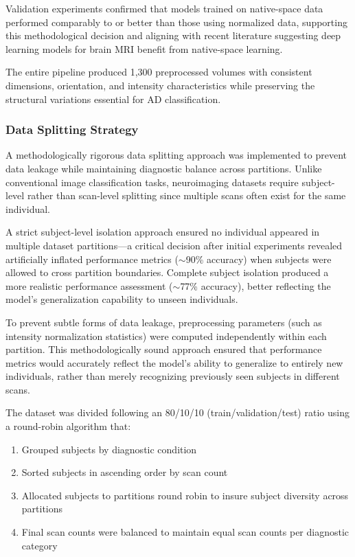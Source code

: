\documentclass[11pt, a4paper]{article}
\begin{document}
Validation experiments confirmed that models trained on native-space data performed comparably to or better than those using normalized data, supporting this methodological decision and aligning with recent literature suggesting deep learning models for brain MRI benefit from native-space learning.

The entire pipeline produced 1,300 preprocessed volumes with consistent dimensions, orientation, and intensity characteristics while preserving the structural variations essential for AD classification.

\subsubsection{Data Splitting Strategy}

A methodologically rigorous data splitting approach was implemented to prevent data leakage while maintaining diagnostic balance across partitions. Unlike conventional image classification tasks, neuroimaging datasets require subject-level rather than scan-level splitting since multiple scans often exist for the same individual.

A strict subject-level isolation approach ensured no individual appeared in multiple dataset partitions—a critical decision after initial experiments revealed artificially inflated performance metrics ($\sim$90\% accuracy) when subjects were allowed to cross partition boundaries. Complete subject isolation produced a more realistic performance assessment ($\sim$77\% accuracy), better reflecting the model's generalization capability to unseen individuals.

To prevent subtle forms of data leakage, preprocessing parameters (such as intensity normalization statistics) were computed independently within each partition. This methodologically sound approach ensured that performance metrics would accurately reflect the model's ability to generalize to entirely new individuals, rather than merely recognizing previously seen subjects in different scans.

The dataset was divided following an 80/10/10 (train/validation/test) ratio using a round-robin algorithm that:
\begin{enumerate}
    \item Grouped subjects by diagnostic condition
    \item Sorted subjects in ascending order by scan count
    \item Allocated subjects to partitions round robin to insure subject diversity across partitions
    \item Final scan counts were balanced to maintain equal scan counts per diagnostic category
\end{enumerate}
\end{document}
